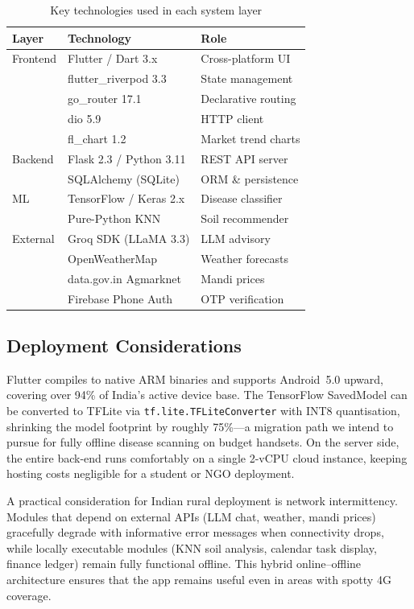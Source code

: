 \documentclass[conference]{IEEEtran}
\begin{document}
\begin{table}[t]
\centering \caption{Key technologies used in each system layer} \label{tab:stack}
\begin{tabular}{lll}
\toprule
\textbf{Layer} & \textbf{Technology} & \textbf{Role} \\
\midrule
Frontend  & Flutter / Dart 3.x       & Cross-platform UI \\
          & flutter\_riverpod 3.3     & State management \\
          & go\_router 17.1           & Declarative routing \\
          & dio 5.9                   & HTTP client \\
          & fl\_chart 1.2             & Market trend charts \\
Backend   & Flask 2.3 / Python 3.11   & REST API server \\
          & SQLAlchemy (SQLite)       & ORM \& persistence \\
ML        & TensorFlow / Keras 2.x    & Disease classifier \\
          & Pure-Python KNN           & Soil recommender \\
External  & Groq SDK (LLaMA 3.3)      & LLM advisory \\
          & OpenWeatherMap            & Weather forecasts \\
          & data.gov.in Agmarknet     & Mandi prices \\
          & Firebase Phone Auth       & OTP verification \\
\bottomrule
\end{tabular}
\end{table}

\subsection{Deployment Considerations}
Flutter compiles to native ARM binaries and supports
Android~5.0 upward, covering over 94\% of India's active device base. The TensorFlow SavedModel can
be converted to TFLite via \texttt{tf.lite.TFLiteConverter} with INT8 quantisation, shrinking the
model footprint by roughly 75\%---a migration path we intend to pursue for fully offline disease
scanning on budget handsets. On the server side, the entire back-end runs comfortably on a single
2-vCPU cloud instance, keeping hosting costs negligible for a student or NGO deployment.

A practical consideration for Indian rural deployment is network intermittency. Modules that depend
on external APIs (LLM chat, weather, mandi prices) gracefully degrade with informative error
messages when connectivity drops, while locally executable modules (KNN soil analysis, calendar task
display, finance ledger) remain fully functional offline. This hybrid online--offline architecture
ensures that the app remains useful even in areas with spotty 4G coverage.
\end{document}

